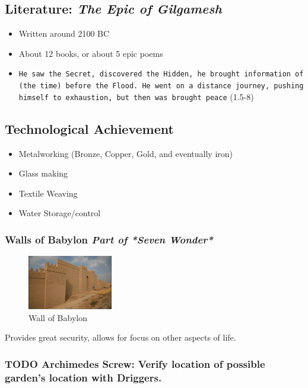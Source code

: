 \documentclass[11pt]{article}
\begin{document}
\subsection{Literature: \emph{The Epic of Gilgamesh}}
\label{sec-3.7}

\begin{itemize}
\item Written around 2100 BC
\item About 12 books, or about 5 epic poems
\item \texttt{He saw the Secret, discovered the Hidden, he brought information of (the time) before the Flood. He went on a distance journey, pushing himself to exhaustion, but then was brought peace} (1.5-8)
\end{itemize}
\subsection{Technological Achievement}
\label{sec-3.8}

\begin{itemize}
\item Metalworking (Bronze, Copper, Gold, and eventually iron)
\item Glass making
\item Textile Weaving
\item Water Storage/control
\end{itemize}
\subsubsection{Walls of Babylon \emph{Part of *Seven Wonder*}}
\label{sec-3.8.1}

\begin{figure}[htb]
\centering
\includegraphics[width=10em]{./img/WallsBabylon.png}
\caption{Wall of Babylon}
\end{figure}

Provides great security, allows for focus on other aspects of life.

\subsubsection{\textbf{TODO} Archimedes Screw: Verify location of possible garden's location with Driggers.}
\label{sec-3.8.2}
\end{document}
